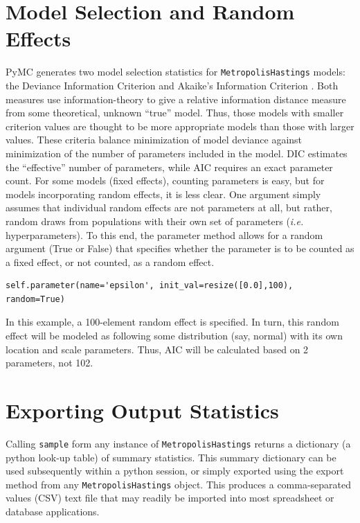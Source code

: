 \documentclass[]{book}
\begin{document}
\section{Model Selection and Random Effects}

PyMC generates two model selection statistics for \verb=MetropolisHastings= models: the Deviance Information Criterion \citep[DIC][]{Spiegelhalter:2002ma} and Akaike’s Information Criterion \citep[AIC][]{Burnham:2002ic}. Both measures use information-theory to give a relative information distance measure from some theoretical, unknown “true” model. Thus, those models with smaller criterion values are thought to be more appropriate models than those with larger values. These criteria balance minimization of model deviance against minimization of the number of parameters included in the model. DIC estimates the “effective” number of parameters, while AIC requires an exact parameter count. For some models (fixed effects), counting parameters is easy, but for models incorporating random effects, it is less clear. One argument simply assumes that individual random effects are not parameters at all, but rather, random draws from populations with their own set of parameters (\emph{i.e.} hyperparameters). To this end, the parameter method allows for a random argument (True or False) that specifies whether the parameter is to be counted as a fixed effect, or not counted, as a random effect.
\begin{verbatim}
self.parameter(name='epsilon', init_val=resize([0.0],100), random=True)
\end{verbatim}

In this example, a 100-element random effect is specified. In turn, this random effect will be modeled as following some distribution (say, normal) with its own location and scale parameters. Thus, AIC will be calculated based on 2 parameters, not 102.

\section{Exporting Output Statistics}

Calling \verb=sample= form any instance of \verb=MetropolisHastings= returns a dictionary (a python look-up table) of summary statistics. This summary dictionary can be used subsequently within a python session, or simply exported using the export method from any \verb=MetropolisHastings= object. This produces a comma-separated values (CSV) text file that may readily be imported into most spreadsheet or database applications. 
\end{document}
